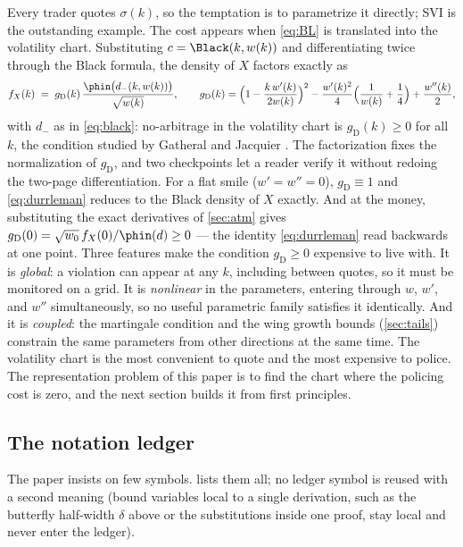 Every trader quotes $\sigma(k)$, so the temptation is to parametrize it
directly; SVI \citep{Gatheral2004,GatheralJacquier2014} is the outstanding
example.  The cost appears when \eqref{eq:BL} is translated into the
volatility chart.  Substituting $c=\Black(k,w(k))$ and differentiating
twice through the Black formula, the density of $X$ factors exactly as
\begin{equation}
f_X(k)\;=\;g_{\mathrm{D}}(k)\,
\frac{\phin\big(d_-(k,w(k))\big)}{\sqrt{w(k)}},
\qquad
g_{\mathrm{D}}(k)=
\Big(1-\frac{k\,w'(k)}{2w(k)}\Big)^{2}
-\frac{w'(k)^{2}}{4}\Big(\frac{1}{w(k)}+\frac14\Big)
+\frac{w''(k)}{2},
\label{eq:durrleman}
\end{equation}
with $d_-$ as in \eqref{eq:black}: no-arbitrage in the volatility chart
is $g_{\mathrm{D}}(k)\ge0$ for all $k$, the condition studied by
Gatheral and Jacquier \citep[\S2]{GatheralJacquier2014}.  The
factorization fixes the normalization of $g_{\mathrm{D}}$, and two
checkpoints let a reader verify it without redoing the two-page
differentiation.  For a flat smile ($w'=w''=0$), $g_{\mathrm{D}}\equiv1$
and \eqref{eq:durrleman} reduces to the Black density of $X$ exactly.
And at the money, substituting the exact derivatives of
\cref{sec:atm} gives $g_{\mathrm{D}}(0)=\sqrt{w_0}\,f_X(0)/\phin(d)\ge0$
--- the identity \eqref{eq:durrleman} read backwards at one point.
Three features make the condition $g_{\mathrm{D}}\ge0$
expensive to live with.  It is \emph{global}: a violation can appear at any
$k$, including between quotes, so it must be monitored on a grid.  It is
\emph{nonlinear} in the parameters, entering through $w$, $w'$, and $w''$
simultaneously, so no useful parametric family satisfies it identically.
And it is \emph{coupled}: the martingale condition and the wing growth
bounds (\cref{sec:tails}) constrain the same parameters from other
directions at the same time.  The volatility chart is the most convenient
to quote and the most expensive to police.  The representation problem of
this paper is to find the chart where the policing cost is zero, and the
next section builds it from first principles.

\subsection{The notation ledger}

The paper insists on few symbols.   lists them all; no
ledger symbol is reused with a second meaning (bound variables local to
a single derivation, such as the butterfly half-width $\delta$ above or
the substitutions inside one proof, stay local and never enter the
ledger).

